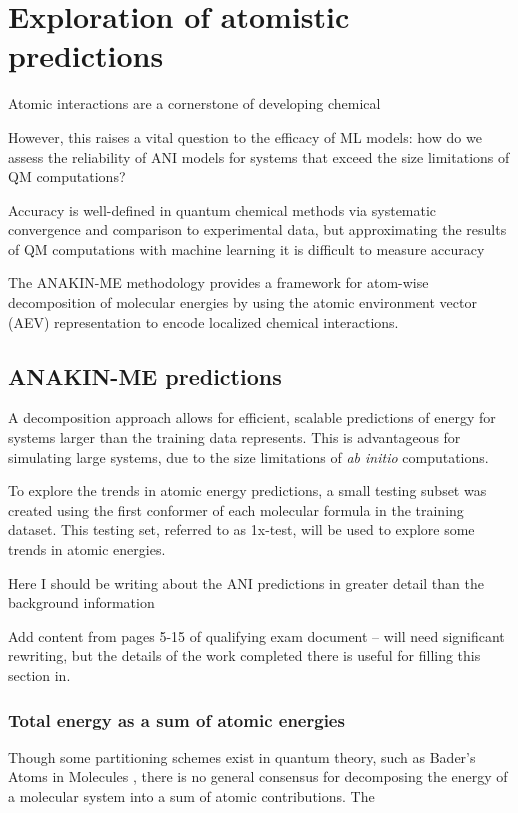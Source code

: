 \chapter{Exploration of atomistic predictions}
\label{chapter2}

Atomic interactions are a cornerstone of developing chemical 

However, this raises a vital question to the efficacy of ML models: how do we assess the reliability of ANI models for systems that exceed the size limitations of QM computations?

Accuracy is well-defined in quantum chemical methods via systematic convergence and comparison to experimental data, but approximating the results of QM computations with machine learning it is difficult to measure accuracy 

The ANAKIN-ME methodology provides a framework for atom-wise decomposition of molecular energies by using the atomic environment vector (AEV) representation to encode localized chemical interactions.

\section{ANAKIN-ME predictions}
\label{sec:ANI_predictions}

A decomposition approach allows for efficient, scalable predictions of energy for systems larger than the training data represents.
This is advantageous for simulating large systems, due to the size limitations of \textit{ab initio} computations.

To explore the trends in atomic energy predictions, a small testing subset was created using the first conformer of each molecular formula in the training dataset.
This testing set, referred to as 1x-test, will be used to explore some trends in atomic energies.

Here I should be writing about the ANI predictions in greater detail than the background information

Add content from pages 5-15 of qualifying exam document -- will need significant rewriting, but the details of the work completed there is useful for filling this section in. 


\subsection{Total energy as a sum of atomic energies}
\label{subsec:total_E_sum_AEs}

Though some partitioning schemes exist in quantum theory, such as Bader's Atoms in Molecules \cite{bader_aim}, there is no general consensus for decomposing the energy of a molecular system into a sum of atomic contributions.
The 


